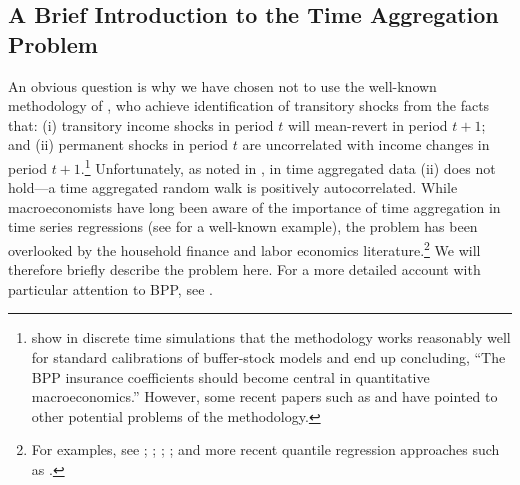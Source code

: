 \documentclass[titlepage]{\econtex}\newcommand{\texname}{ConsumptionHeterogeneity}
\begin{document}
	\subsection{A Brief Introduction to the Time Aggregation Problem} \label{TimeAgg}
	An obvious question is why we have chosen not to use the well-known methodology of \cite{blundell_consumption_2008}, who achieve identification of transitory shocks from the facts that: (i) transitory income shocks in period $t$ will mean-revert in period $t+1$; and (ii) permanent shocks in period $t$ are uncorrelated with income changes in period $t+1$.\footnote{\cite{kaplan_how_2010} show in discrete time simulations that the methodology works reasonably well for standard calibrations of buffer-stock models and end up concluding, ``The BPP insurance coefficients should become central in quantitative macroeconomics.'' However, some recent papers such as \cite{commault_how_2017} and \cite{hryshko_income_2018} have pointed to other potential problems of the methodology.} Unfortunately, as noted in \cite{working_note_1960}, in time aggregated data (ii) does not hold---a time aggregated random walk is positively autocorrelated. 
	While macroeconomists have long been aware of the importance of time aggregation in time series regressions (see \cite{campbell_consumption_1989} for a well-known example), the problem has been overlooked by the household finance and labor economics literature.\footnote{For examples, see \cite{moffitt_trends_2012}; \cite{meghir_income_2004}; \cite{nielsen_impact_2004}; \cite{heathcote_unequal_2010}; and more recent quantile regression approaches such as \cite{arellano_earnings_2017}.} We will therefore briefly describe the problem here. For a more detailed account with particular attention to BPP, see \cite{crawley_time_2020}.
	
\end{document}
